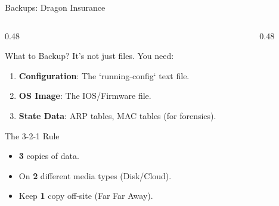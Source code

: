 \documentclass[aspectratio=169]{beamer}  %
\begin{document}
\begin{frame}{Backups: Dragon Insurance}
    \begin{columns}[T]
        \begin{column}{0.48\textwidth}
            \begin{block}{What to Backup?}
                \footnotesize
                It's not just files. You need:
                \begin{enumerate}
                    \item \textbf{Configuration}: The `running-config` text file.
                    \item \textbf{OS Image}: The IOS/Firmware file.
                    \item \textbf{State Data}: ARP tables, MAC tables (for forensics).
                \end{enumerate}
            \end{block}
            \begin{alertblock}{The 3-2-1 Rule}
                \footnotesize
                \begin{itemize}
                    \item \textbf{3} copies of data.
                    \item On \textbf{2} different media types (Disk/Cloud).
                    \item Keep \textbf{1} copy off-site (Far Far Away).
                \end{itemize}
            \end{alertblock}
        \end{column}
        \begin{column}{0.48\textwidth}
            \begin{center}
            \end{center}
        \end{column}
    \end{columns}
\end{frame}
\end{document}
